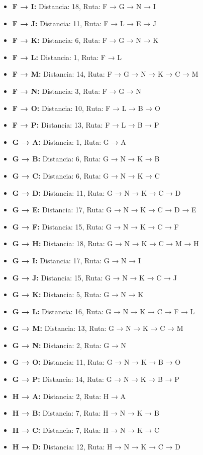 \documentclass[12pt]{article}
\begin{document}
\begin{itemize}
\item \textbf{F → I:} Distancia: 18, Ruta: F → G → N → I
\item \textbf{F → J:} Distancia: 11, Ruta: F → L → E → J
\item \textbf{F → K:} Distancia: 6, Ruta: F → G → N → K
\item \textbf{F → L:} Distancia: 1, Ruta: F → L
\item \textbf{F → M:} Distancia: 14, Ruta: F → G → N → K → C → M
\item \textbf{F → N:} Distancia: 3, Ruta: F → G → N
\item \textbf{F → O:} Distancia: 10, Ruta: F → L → B → O
\item \textbf{F → P:} Distancia: 13, Ruta: F → L → B → P
\item \textbf{G → A:} Distancia: 1, Ruta: G → A
\item \textbf{G → B:} Distancia: 6, Ruta: G → N → K → B
\item \textbf{G → C:} Distancia: 6, Ruta: G → N → K → C
\item \textbf{G → D:} Distancia: 11, Ruta: G → N → K → C → D
\item \textbf{G → E:} Distancia: 17, Ruta: G → N → K → C → D → E
\item \textbf{G → F:} Distancia: 15, Ruta: G → N → K → C → F
\item \textbf{G → H:} Distancia: 18, Ruta: G → N → K → C → M → H
\item \textbf{G → I:} Distancia: 17, Ruta: G → N → I
\item \textbf{G → J:} Distancia: 15, Ruta: G → N → K → C → J
\item \textbf{G → K:} Distancia: 5, Ruta: G → N → K
\item \textbf{G → L:} Distancia: 16, Ruta: G → N → K → C → F → L
\item \textbf{G → M:} Distancia: 13, Ruta: G → N → K → C → M
\item \textbf{G → N:} Distancia: 2, Ruta: G → N
\item \textbf{G → O:} Distancia: 11, Ruta: G → N → K → B → O
\item \textbf{G → P:} Distancia: 14, Ruta: G → N → K → B → P
\item \textbf{H → A:} Distancia: 2, Ruta: H → A
\item \textbf{H → B:} Distancia: 7, Ruta: H → N → K → B
\item \textbf{H → C:} Distancia: 7, Ruta: H → N → K → C
\item \textbf{H → D:} Distancia: 12, Ruta: H → N → K → C → D

\end{itemize}
\end{document}
